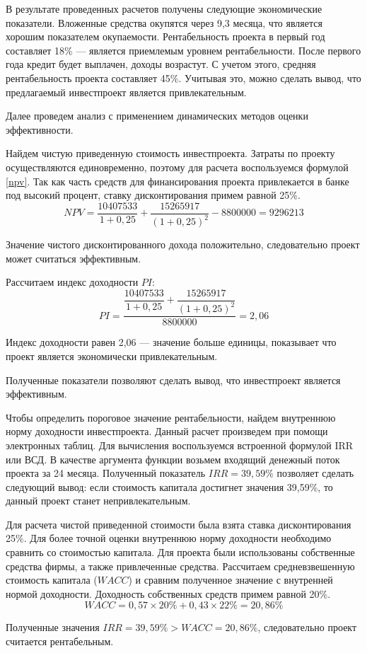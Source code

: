 В результате проведенных расчетов получены следующие экономические показатели. Вложенные средства окупятся через 9,3 месяца, что является хорошим показателем окупаемости. Рентабельность проекта в первый год составляет 18\% --- является приемлемым уровнем рентабельности. После первого года кредит будет выплачен, доходы возрастут. С учетом этого, средняя рентабельность проекта составляет 45\%. Учитывая это, можно сделать вывод, что предлагаемый инвестпроект является привлекательным.



Далее проведем анализ с применением динамических методов оценки эффективности.

Найдем чистую приведенную стоимость инвестпроекта. Затраты по проекту осуществляются единовременно, поэтому для расчета воспользуемся формулой \eqref{npv}. Так как часть средств для финансирования проекта привлекается в банке под высокий процент, ставку дисконтирования примем равной 25\%.
\begin{equation*}\label{npv_mod}
NPV =  \dfrac{10407533}{1+0,25} + \dfrac{15265917}{(1+0,25)^2}- 8800000 = 9296213
\end{equation*}

Значение чистого дисконтированного дохода положительно, следовательно проект может считаться эффективным.

Рассчитаем индекс доходности $PI$:
\begin{equation*}
PI = \dfrac{\dfrac{10407533}{1+0,25} + \dfrac{15265917}{(1+0,25)^2}}{8800000} = 2,06
\end{equation*}

Индекс доходности равен 2,06 --- значение больше единицы, показывает что проект является экономически привлекательным.

Полученные показатели позволяют сделать вывод, что инвестпроект является эффективным.

Чтобы определить пороговое значение рентабельности, найдем внутреннюю норму доходности инвестпроекта. Данный расчет произведем при помощи электронных таблиц. Для вычисления воспользуемся встроенной формулой IRR или ВСД. В качестве аргумента функции возьмем входящий денежный поток проекта за 24 месяца. Полученный показатель $IRR = 39,59\%$ позволяет сделать следующий вывод: если стоимость капитала достигнет значения 39,59\%, то данный проект станет непривлекательным.

Для расчета чистой приведенной стоимости была взята ставка дисконтирования 25\%. Для более точной оценки внутреннюю норму доходности необходимо сравнить со стоимостью капитала. Для проекта были использованы собственные средства фирмы, а также привлеченные средства. Рассчитаем средневзвешенную стоимость капитала ($WACC$) и сравним полученное значение с внутренней нормой доходности. Доходность собственных средств примем равной 20\%.
\begin{equation*}
WACC = 0,57 \times 20\% + 0,43 \times 22\% = 20,86\%
\end{equation*}

Полученные значения  $IRR = 39,59\% > WACC= 20,86\%$, следовательно проект считается рентабельным.




